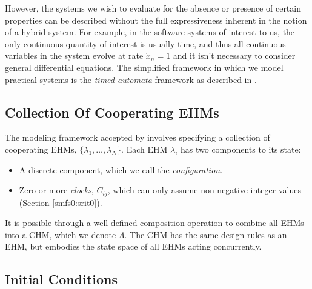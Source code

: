 However, the systems we wish to evaluate for the absence or presence of certain
properties can be described without the full expressiveness
inherent in the notion of a hybrid system.  For example, in the software systems
of interest to us, the only continuous quantity of interest is usually time, and
thus all continuous variables in the system evolve at rate $\dot{x}_n = 1$ and it
isn't necessary to consider general differential equations.  The simplified framework
in which we model practical systems is the \emph{timed automata} framework as described
in \cite{bib:p:theoryofta:alurdill90}.


\subsection{Collection Of Cooperating EHMs}
\label{smfs0:scce0}

The modeling framework accepted by \swname{} involves specifying a collection
of cooperating EHMs, $\{ \lambda_1, \ldots{}, \lambda_N \}$.  Each EHM $\lambda_i$
has 
two components to its state:

\begin{itemize}
\item A discrete component, which we call the \emph{configuration}.
\item Zero or more \emph{clocks}, $C_{ij}$, which can only assume
      non-negative integer values (Section \ref{smfs0:srit0}).
\end{itemize}

It is possible through a well-defined composition operation to combine all
EHMs into a CHM, which we denote $\Lambda$.  The CHM has the same design rules
as an EHM, but embodies the state space of all EHMs acting concurrently.

\subsection{Initial Conditions}
\label{smfs0:sico0}

